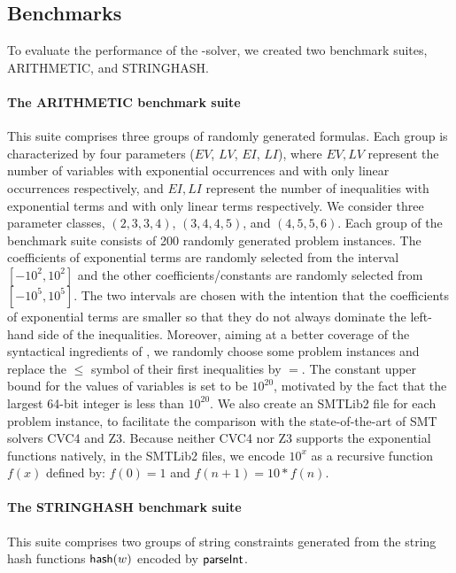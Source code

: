 \subsection{Benchmarks}

To evaluate the performance of the {\paexp}-solver, we created two benchmark suites, ARITHMETIC, and STRINGHASH.

\paragraph{The ARITHMETIC benchmark suite} 
This suite comprises three groups of randomly generated {\paexp} formulas. Each group is characterized by four parameters ($EV$, $LV$, $EI$, $LI$), where $EV, LV$ represent the number of variables with exponential occurrences and with only linear occurrences respectively, and $EI, LI$ represent the number of inequalities with exponential terms and with only linear terms respectively. 
We consider three parameter classes, $(2, 3, 3, 4)$, $(3, 4, 4, 5)$, and $(4, 5, 5, 6)$. 
Each group of the benchmark suite consists of 200 randomly generated problem instances. The coefficients of exponential terms are randomly selected from the interval $[-10^2, 10^2]$ and the other coefficients/constants are randomly selected from $[-10^5, 10^5]$. The two intervals are chosen with the intention that the coefficients of exponential terms are smaller so that they do not always dominate the left-hand side of the inequalities. Moreover, aiming at a better coverage of the syntactical ingredients of {\paexp}, we randomly choose some problem instances and replace the $\le$ symbol of their first inequalities by $=$. The constant upper bound for the values of variables is set to be $10^{20}$, motivated by the fact that the largest 64-bit integer is less than $10^{20}$. We also create an SMTLib2 file for each problem instance, to facilitate the comparison with the state-of-the-art of SMT solvers CVC4 and Z3. Because neither CVC4 nor Z3 supports the exponential functions natively, in the SMTLib2 files, we encode $10^x$ as a recursive function $f(x)$ defined by: $f(0) = 1$ and $f(n+1) = 10*f(n)$.

%

\paragraph{The STRINGHASH benchmark suite} 
This suite comprises two groups of string constraints generated from the string hash functions ${\sf hash}(w)$ encoded by $\textsf{parseInt}$.


